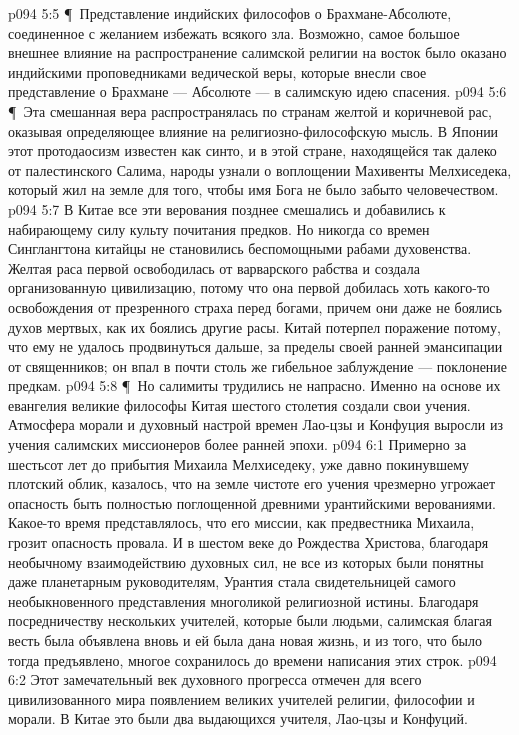 \vs p094 5:5 \P\ \bibnobreakspace Представление индийских философов о Брахмане\hyp{}Абсолюте, соединенное с желанием избежать всякого зла. Возможно, самое большое внешнее влияние на распространение салимской религии на восток было оказано индийскими проповедниками ведической веры, которые внесли свое представление о Брахмане --- Абсолюте --- в салимскую идею спасения.
\vs p094 5:6 \P\ Эта смешанная вера распространялась по странам желтой и коричневой рас, оказывая определяющее влияние на религиозно\hyp{}философскую мысль. В Японии этот протодаосизм известен как синто, и в этой стране, находящейся так далеко от палестинского Салима, народы узнали о воплощении Махивенты Мелхиседека, который жил на земле для того, чтобы имя Бога не было забыто человечеством.
\vs p094 5:7 В Китае все эти верования позднее смешались и добавились к набирающему силу культу почитания предков. Но никогда со времен Синглангтона китайцы не становились беспомощными рабами духовенства. Желтая раса первой освободилась от варварского рабства и создала организованную цивилизацию, потому что она первой добилась хоть какого\hyp{}то освобождения от презренного страха перед богами, причем они даже не боялись духов мертвых, как их боялись другие расы. Китай потерпел поражение потому, что ему не удалось продвинуться дальше, за пределы своей ранней эмансипации от священников; он впал в почти столь же гибельное заблуждение --- поклонение предкам.
\vs p094 5:8 \P\ Но салимиты трудились не напрасно. Именно на основе их евангелия великие философы Китая шестого столетия создали свои учения. Атмосфера морали и духовный настрой времен Лао\hyp{}цзы и Конфуция выросли из учения салимских миссионеров более ранней эпохи.
\vs p094 6:1 Примерно за шестьсот лет до прибытия Михаила Мелхиседеку, уже давно покинувшему плотский облик, казалось, что на земле чистоте его учения чрезмерно угрожает опасность быть полностью поглощенной древними урантийскими верованиями. Какое\hyp{}то время представлялось, что его миссии, как предвестника Михаила, грозит опасность провала. И в шестом веке до Рождества Христова, благодаря необычному взаимодействию духовных сил, не все из которых были понятны даже планетарным руководителям, Урантия стала свидетельницей самого необыкновенного представления многоликой религиозной истины. Благодаря посредничеству нескольких учителей, которые были людьми, салимская благая весть была объявлена вновь и ей была дана новая жизнь, и из того, что было тогда предъявлено, многое сохранилось до времени написания этих строк.
\vs p094 6:2 Этот замечательный век духовного прогресса отмечен для всего цивилизованного мира появлением великих учителей религии, философии и морали. В Китае это были два выдающихся учителя, Лао\hyp{}цзы и Конфуций.
